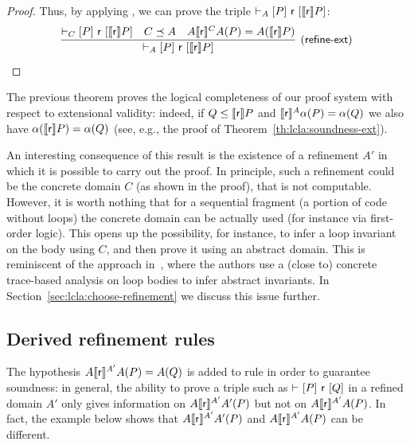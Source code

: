 \begin{proof}
	Thus, by applying , we can prove the triple $\vdash_{A}\nobreak[P]~\mathsf{r}~[\llbracket\mathsf{r}\rrbracket P]$:
	\[
	\infer[(\mathsf{refine\mbox{-}ext})]
	{\lcl{A}{P}{\regr}{\denot{\regr} P}}
	{\lcl{C}{P}{\regr}{\denot{\regr} P} & C \preceq A & A \denot{\regr}^{C} A(P) = A(\denot{\regr} P)}
	\]
\end{proof}

The previous theorem proves the logical completeness of our proof system with respect to extensional validity: indeed, if $Q \le \llbracket\mathsf{r}\rrbracket P$ and $\llbracket\mathsf{r}\rrbracket^A \alpha(P) = \alpha(Q)$ we also have $\alpha(\llbracket\mathsf{r}\rrbracket P) = \alpha(Q)$ (see, e.g., the proof of Theorem~\ref{th:lcla:soundness-ext}).

An interesting consequence of this result is the existence of a refinement $A'$ in which it is possible to carry out the proof. In principle, such a refinement could be the concrete domain $C$ (as shown in the proof), that is not computable. However, it is worth nothing that for a sequential fragment (a portion of code without loops) the concrete domain can be actually used (for instance via first-order logic). This opens up the possibility, for instance, to infer a loop invariant on the body using $C$, and then prove it using an abstract domain. This is reminiscent of the approach in~\cite{CL96}, where the authors use a (close to) concrete trace-based analysis on loop bodies to infer abstract invariants.
In Section~\ref{sec:lcla:choose-refinement} we discuss this issue further.

\subsection{Derived refinement rules}\label{sec:lcla:derived-rules}

The hypothesis $A \llbracket\mathsf{r}\rrbracket^{A'} A(P) = A(Q)$ is added to rule  in order to guarantee soundness: in general, the ability to prove a triple such as $\vdash_{}\nobreak[P]~\mathsf{r}~[Q]$ in a refined domain $A'$ only gives information on $A \llbracket\mathsf{r}\rrbracket^{A'} A'(P)$ but not on $A \llbracket\mathsf{r}\rrbracket^{A'} A(P)$. In fact, the example below shows that $A \llbracket\mathsf{r}\rrbracket^{A'} A'(P) $ and $A \llbracket\mathsf{r}\rrbracket^{A'} A(P)$ can be different.


